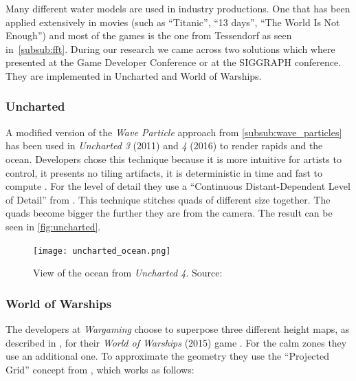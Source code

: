 
Many different water models are used in industry productions. One that has been
applied extensively in movies (such as ``Titanic'', ``13 days'', ``The World Is
Not Enough'') and most of the games is the one from Tessendorf
\autocite{tessendorf2001simulating} as seen in~\ref{subsub:fft}.  During our
research we came across two solutions which where presented at the Game
Developer Conference or at the SIGGRAPH conference. They are implemented in
Uncharted and World of Warships.

\subsubsection{Uncharted}\label{subsub:uncharted}

A modified version of the \textit{Wave Particle} approach from
\cref{subsub:wave_particles} has been used in \textit{Uncharted 3} (2011) and
\textit{4} (2016) to render rapids and the ocean. Developers chose this
technique because it is more intuitive for artists to control, it presents no
tiling artifacts, it is deterministic in time and fast to compute
\autocite{gonzalez2012water}. For the level of detail they use a ``Continuous
Distant-Dependent Level of Detail'' from \autocite{strugar2009continuous}. This
technique stitches quads of different size together. The quads become bigger the
further they are from the camera. The result can be seen in
\autoref{fig:uncharted}.

\begin{figure}[ht]
    \centering
    \texttt{[image: uncharted\_ocean.png]}
    \caption{View of the ocean from \textit{Uncharted 4}. Source:
    \autocite{gonzalez2016rendering}}\label{fig:uncharted}
\end{figure}


\subsubsection{World of Warships}\label{subsub:world_of_warships}

The developers at \textit{Wargaming} choose to superpose three different height
maps, as described in \autocite[Chapter~18]{pharr2005gpu}, for their
\textit{World of Warships} (2015) game \autocite{kryachko2016sea}.  For the calm
zones they use an additional one. To approximate the geometry they use the
``Projected Grid'' concept from \autocite{claes2004real}, which works as
follows:

